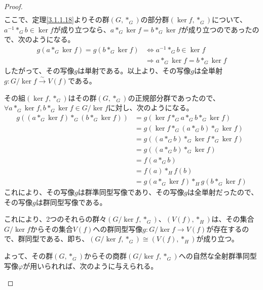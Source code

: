 \documentclass[dvipdfmx]{jsarticle}
\begin{document}
\begin{proof}
\begin{align*}
\end{align*}
ここで、定理\ref{3.1.1.18}よりその群$\left( G,*_{G} \right)$の部分群$\left( \ker f,*_{G} \right)$について、$a^{- 1}*_{G}b \in \ker f$が成り立つなら、$a*_{G}\ker f = b*_{G}\ker f$が成り立つのであったので、次のようになる。
\begin{align*}
g\left( a*_{G}\ker f \right) = g\left( b*_{G}\ker f \right) &\Leftrightarrow a^{- 1}*_{G}b \in \ker f\\
&\Rightarrow a*_{G}\ker f = b*_{G}\ker f
\end{align*}
したがって、その写像$g$は単射である。以上より、その写像$g$は全単射$g:{G}/{\ker f}\overset{\sim}{\rightarrow}V(f)$である。\par
その組$\left( \ker f,*_{G} \right)$はその群$\left( G,*_{G} \right)$の正規部分群であったので、$\forall a*_{G}\ker f,b*_{G}\ker f \in {G}/{\ker f}$に対し、次のようになる。
\begin{align*}
g\left( \left( a*_{G}\ker f \right)*_{G}\left( b*_{G}\ker f \right) \right) &= g\left( \ker f*_{G}a*_{G}b*_{G}\ker f \right)\\
&= g\left( \ker f*_{G}\left( a*_{G}b \right)*_{G}\ker f \right)\\
&= g\left( \left( a*_{G}b \right)*_{G}\ker f*_{G}\ker f \right)\\
&= g\left( \left( a*_{G}b \right)*_{G}\ker f \right)\\
&= f\left( a*_{G}b \right)\\
&= f(a)*_{H}f(b)\\
&= g\left( a*_{G}\ker f \right)*_{H}g\left( b*_{G}\ker f \right)
\end{align*}
これにより、その写像$g$は群準同型写像であり、その写像$g$は全単射だったので、その写像$g$は群同型写像である。\par
これにより、2つのそれらの群々$\left( G/\ker f,*_{G} \right)$、$\left( V(f),*_{H} \right)$は、その集合$G/\ker f$からその集合$V(f)$への群同型写像$g:{G}/{\ker f} \rightarrow V(f)$が存在するので、群同型である、即ち、$\left( {G}/{\ker f},*_{G} \right) \cong \left( V(f),*_{H} \right)$が成り立つ。\par
よって、その群$\left( G,*_{G} \right)$からその商群$\left( {G}/{\ker f},*_{G} \right)$への自然な全射群準同型写像$\varphi$が用いられれば、次のように与えられる。
\begin{center}
\end{center}
\end{proof}
\end{document}
